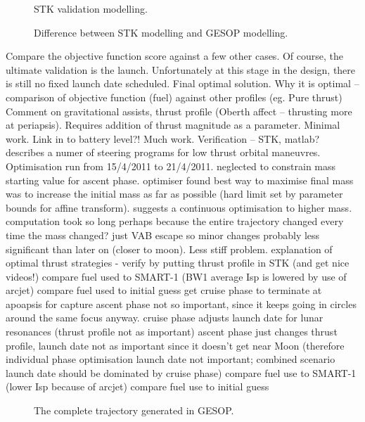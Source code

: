 \begin{figure}
\centering
\caption{STK validation modelling.}
\label{fig:STK-verification}
\end{figure}

\begin{figure}
\centering
\caption{Difference between STK modelling and GESOP modelling.}
\label{fig:STK-error}
\end{figure}

Compare the objective function score against a few other cases.
Of course, the ultimate validation is the launch. Unfortunately at this stage in the design, there is still no fixed launch date scheduled.
Final optimal solution.
Why it is optimal – comparison of objective function (fuel) against other profiles (eg. Pure thrust)
Comment on gravitational assists, thrust profile (Oberth affect – thrusting more at periapsis).
Requires addition of thrust magnitude as a parameter. Minimal work.
Link in to battery level?! Much work.
Verification – STK, matlab?
\textcite{Pollard2000} describes a numer of steering programs for low thrust orbital maneuvres.
Optimisation run from 15/4/2011 to 21/4/2011. neglected to constrain mass starting value for ascent phase. optimiser found best way to maximise final mass was to increase the initial mass as far as possible (hard limit set by parameter bounds for affine transform). suggests a continuous optimisation to higher mass. computation took so long perhaps because the entire trajectory changed every time the mass changed? just VAB escape so minor changes probably less significant than later on (closer to moon). Less stiff problem.
explanation of optimal thrust strategies - \textcite{Herbiniere2000}
verify by putting thrust profile in STK (and get nice videos!)
compare fuel used to SMART-1 (BW1 average Isp is lowered by use of arcjet)
compare fuel used to initial guess
get cruise phase to terminate at apoapsis for capture
ascent phase not so important, since it keeps going in circles around the same focus anyway.
cruise phase adjusts launch date for lunar resonances (thrust profile not as important)
ascent phase just changes thrust profile, launch date not as important since it doesn't get near Moon (therefore individual phase optimisation launch date not important; combined scenario launch date should be dominated by cruise phase)
compare fuel use to SMART-1 (lower Isp because of arcjet)
compare fuel use to initial guess


\begin{figure}
\centering
\def\svgwidth{\textwidth}

\caption{The complete trajectory generated in GESOP.}
\label{fig:Whole-trajectory}
\end{figure}
